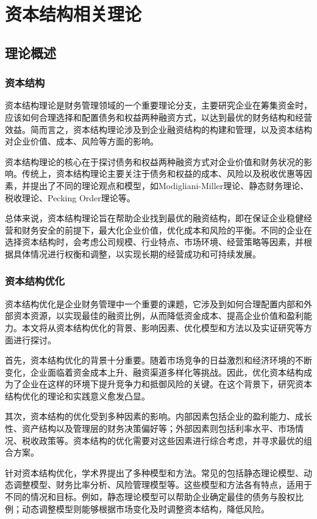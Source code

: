 \chapter{资本结构相关理论}
\section{理论概述}
\subsection{资本结构}
资本结构理论是财务管理领域的一个重要理论分支，主要研究企业在筹集资金时，应该如何合理选择和配置债务和权益两种融资方式，以达到最优的财务结构和经营效益。简而言之，资本结构理论涉及到企业融资结构的构建和管理，以及资本结构对企业价值、成本、风险等方面的影响。

资本结构理论的核心在于探讨债务和权益两种融资方式对企业价值和财务状况的影响。传统上，资本结构理论主要关注于债务和权益的成本、风险以及税收优惠等因素，并提出了不同的理论观点和模型，如Modigliani-Miller理论、静态财务理论、税收理论、Pecking Order理论等。

总体来说，资本结构理论旨在帮助企业找到最优的融资结构，即在保证企业稳健经营和财务安全的前提下，最大化企业价值，优化成本和风险的平衡。不同的企业在选择资本结构时，会考虑公司规模、行业特点、市场环境、经营策略等因素，并根据具体情况进行权衡和调整，以实现长期的经营成功和可持续发展。
\subsection{资本结构优化}
资本结构优化是企业财务管理中一个重要的课题，它涉及到如何合理配置内部和外部资本资源，以实现最佳的融资比例，从而降低资金成本、提高企业价值和盈利能力。本文将从资本结构优化的背景、影响因素、优化模型和方法以及实证研究等方面进行探讨。

首先，资本结构优化的背景十分重要。随着市场竞争的日益激烈和经济环境的不断变化，企业面临着资金成本上升、融资渠道多样化等挑战。因此，优化资本结构成为了企业在这样的环境下提升竞争力和抵御风险的关键。在这个背景下，研究资本结构优化的理论和实践意义愈发凸显。

其次，资本结构的优化受到多种因素的影响。内部因素包括企业的盈利能力、成长性、资产结构以及管理层的财务决策偏好等；外部因素则包括利率水平、市场情况、税收政策等。资本结构的优化需要对这些因素进行综合考虑，并寻求最优的组合方案。

针对资本结构优化，学术界提出了多种模型和方法。常见的包括静态理论模型、动态调整模型、财务比率分析、风险管理模型等。这些模型和方法各有特点，适用于不同的情况和目标。例如，静态理论模型可以帮助企业确定最佳的债务与股权比例；动态调整模型则能够根据市场变化及时调整资本结构，降低风险。

